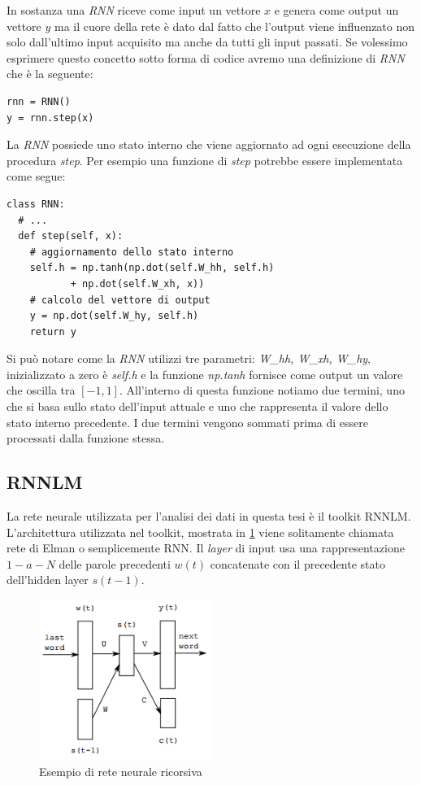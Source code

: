 \documentclass[a4paper,12pt,openright,twoside]{report}
\theoremstyle{definition}
\begin{document}
In sostanza una \emph{RNN} riceve come input un vettore $x$ e genera come output un vettore $y$ ma il cuore della rete
è dato dal fatto che l'output viene influenzato non solo dall'ultimo input acquisito ma anche da tutti gli 
input passati. Se volessimo esprimere questo concetto sotto forma di codice avremo una definizione di \emph{RNN}
che è la seguente:
\begin{verbatim}
rnn = RNN()
y = rnn.step(x)
\end{verbatim}
La \emph{RNN} possiede uno stato interno che viene aggiornato ad ogni esecuzione della procedura \emph{step}.
Per esempio una funzione di \emph{step} potrebbe essere implementata come segue:
\begin{verbatim}
class RNN:
  # ...
  def step(self, x):
    # aggiornamento dello stato interno
    self.h = np.tanh(np.dot(self.W_hh, self.h) 
           + np.dot(self.W_xh, x))
    # calcolo del vettore di output
    y = np.dot(self.W_hy, self.h)
    return y
\end{verbatim}

Si può notare come la \emph{RNN} utilizzi tre parametri: \emph{W\_hh, W\_xh, W\_hy}, inizializzato a zero
è \emph{self.h} e la funzione \emph{np.tanh} fornisce come output un valore che oscilla tra $[-1,1]$.
All'interno di questa funzione notiamo due termini, uno che si basa sullo stato dell'input attuale e uno che 
rappresenta il valore dello stato interno precedente. I due termini vengono sommati prima di essere processati dalla 
funzione stessa.

\subsection{RNNLM}
La rete neurale utilizzata per l'analisi dei dati in questa tesi è il toolkit RNNLM. 
L'architettura utilizzata nel toolkit, mostrata in \ref{fig:rnnlm} viene solitamente chiamata rete di Elman o semplicemente RNN. 
Il \emph{layer} di input usa una rappresentazione $1-a-N$ delle 
parole precedenti $w(t)$ concatenate con il precedente stato dell'hidden layer $s(t - 1)$.
\begin{figure}[ht]
  \centering
      \includegraphics[width=0.5\textwidth]{Immagini/rnnlm_rete.png}
      \caption{Esempio di rete neurale ricorsiva}
\label{fig:rnnlm}
\end{figure}
\end{document}
